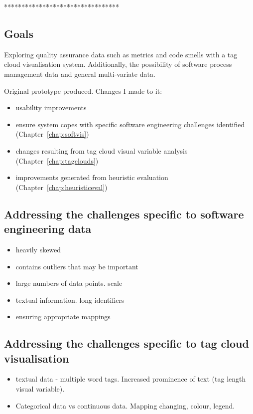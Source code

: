 *********************************

\subsection{Goals}

Exploring quality assurance data such as metrics and code smells with a tag cloud visualisation system. Additionally, the possibility of software process management data and general multi-variate data.

Original prototype produced. Changes I made to it:

\begin{itemize}
\item usability improvements
\item ensure system copes with specific software engineering challenges identified (Chapter~\ref{chap:softvis})
\item changes resulting from tag cloud visual variable analysis (Chapter~\ref{chap:tagclouds})
\item improvements generated from heuristic evaluation (Chapter~\ref{chap:heuristiceval})
\end{itemize}

\subsection{Addressing the challenges specific to software engineering data}

\begin{itemize}
\item heavily skewed
\item contains outliers that may be important
\item large numbers of data points. scale
\item textual information. long identifiers
\item ensuring appropriate mappings
\end{itemize}

\subsection{Addressing the challenges specific to tag cloud visualisation}


\begin{itemize}
\item textual data - multiple word tags. Increased prominence of text (tag length visual variable).
\item Categorical data vs continuous data. Mapping changing, colour, legend.
\end{itemize}

